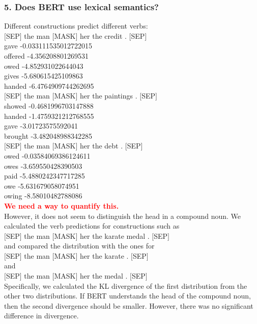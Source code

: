 \documentclass[twocolumn,dvipdfmx, 10pt]{article}
\begin{document}
\subsubsection*{5. Does BERT use lexical semantics?}
Different constructions predict different verbs:\\
$[$SEP$]$ the man $[$MASK$]$ her the credit . $[$SEP$]$\\
gave		-0.033111535012722015\\
offered	-4.356208801269531\\
owed	-4.852931022644043\\
gives		-5.680615425109863\\
handed	-6.4764909744262695\\
$[$SEP$]$ the man $[$MASK$]$ her the paintings . $[$SEP$]$\\
showed	-0.4681996703147888\\
handed	-1.4759321212768555\\
gave		-3.01723575592041\\
brought	-3.482048988342285\\
$[$SEP$]$ the man $[$MASK$]$ her the debt . $[$SEP$]$\\
owed	-0.03584069386124611\\
owes		-3.659550428390503\\
paid		-5.4880242347717285\\
owe		-5.631679058074951\\
owing	-8.58010482788086\\
\textcolor{red}{\textbf{We need a way to quantify this.}}\\
However, it does not seem to distinguish the head in a compound noun.  We calculated the verb predictions for constructions such as\\
$[$SEP$]$ the man $[$MASK$]$ her the karate medal . $[$SEP$]$\\
and compared the distribution with the ones for\\
$[$SEP$]$ the man $[$MASK$]$ her the karate . $[$SEP$]$\\
and\\
$[$SEP$]$ the man $[$MASK$]$ her the medal . $[$SEP$]$\\
Specifically, we calculated the KL divergence of the first distribution from the other two distributions.
If BERT understands the head of the compound noun, then the second divergence should be smaller.  However, there was no significant difference in divergence.\\
\end{document}
